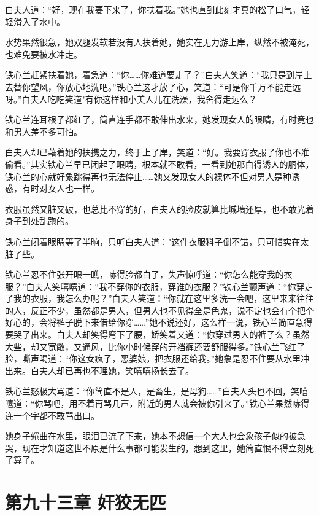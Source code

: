 \documentclass[12pt,oneside]{book}
\begin{document}
白夫人道：``好，现在我要下来了，你扶着我。''她也直到此刻才真的松了口气，轻轻滑入了水中。

水势果然很急，她双腿发软若没有人扶着她，她实在无力游上岸，纵然不被淹死，也难免要被水冲走。

铁心兰赶紧扶着她，着急道：``你\ldots\ldots 你难道要走了？''白夫人笑道：``我只是到岸上去替你望风，你放心地洗吧。''铁心兰这才放了心，笑道：``可是你千万不能走远呀。''白夫人吃吃笑道"有你这样和小美人儿在洗澡，我舍得走远么？

铁心兰连耳根子都红了，简直连手都不敢伸出水来，她发现女人的眼晴，有时竟也和男人差不多可怕。

白夫人却已藉着她的扶携之力，终于上了岸，笑道：``好。我要穿衣服了你也不准偷看。''其实铁心兰早已闭起了眼睛，根本就不敢看，一看到她那白得诱人的胴体，铁心兰的心就好象跳得再也无法停止\ldots\ldots 她又发现女人的裸体不但对男人是种诱惑，有时对女人也一样。

衣服虽然又脏又破，也总比不穿的好，白夫人的脸皮就算比城墙还厚，也不敢光着身子到处乱跑的。

铁心兰闭着眼睛等了半晌，只听白夫人道："这件衣服料子倒不错，只可惜实在太脏了些。

铁心兰忍不住张开眼一瞧，哧得脸都白了，失声惊呼道：``你怎么能穿我的衣服？''白夫人笑嘻嘻道：``我不穿你的衣服，穿谁的衣服？''铁心兰颤声道：``你穿走了我的衣服，我怎么办呢？''白夫人笑道：``你就在这里多洗一会吧，这里来来往往的人，反正不少，虽然都是男人，但男人也不见得全是色鬼，说不定也会有个把个好心的，会将裤子脱下来借给你穿\ldots\ldots{}''她不说还好，这么样一说，铁心兰简直急得要哭了出来。白夫人却笑得弯下了腰，娇笑着又道：``你穿过男人的裤子么？虽然大些，却又宽敞，又通风，比你小时候穿的开裆裤还要舒服得多。''铁心兰飞红了脸，嘶声喝道：``你这女疯子，恶婆娘，把衣服还给我。''她象是忍不住要从水里冲出来。白夫人却已再也不理她，笑嘻嘻扬长去了。

铁心兰怒极大骂道：``你简直不是人，是畜生，是母狗\ldots\ldots{}''白夫人头也不回，笑嘻嘻道：``你骂吧，用不着再骂几声，附近的男人就会被你引来了。''铁心兰果然哧得连一个字都不敢骂出口。

她身子蜷曲在水里，眼泪已流了下来，她本不想信一个大人也会象孩子似的被急哭，现在才知道这世不原是什么事都可能发生的，想到这里，她简直恨不得立刻死了算了。

\hypertarget{ux7b2cux4e5dux5341ux4e09ux7ae0-ux5978ux72e1ux65e0ux5339}{%
\chapter{第九十三章
奸狡无匹}\label{ux7b2cux4e5dux5341ux4e09ux7ae0-ux5978ux72e1ux65e0ux5339}}
\end{document}
